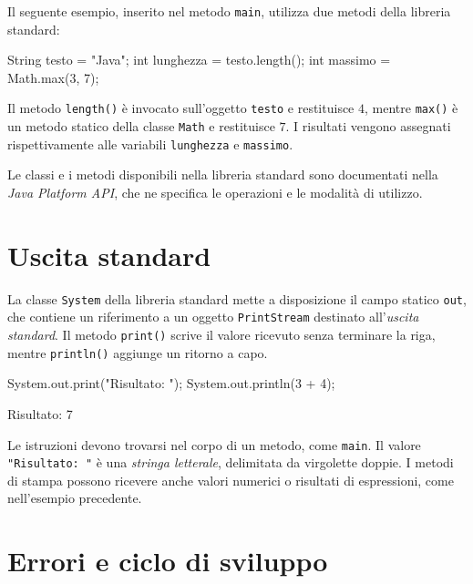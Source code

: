 \begin{example}
Il seguente esempio, inserito nel metodo \texttt{main},
utilizza due metodi della libreria standard:
\begin{unipdcode}[language=Java]
String testo = "Java";
int lunghezza = testo.length();
int massimo = Math.max(3, 7);
\end{unipdcode}
Il metodo \texttt{length()} è invocato sull'oggetto
\texttt{testo} e restituisce \(4\), mentre
\texttt{max()} è un metodo statico della classe
\texttt{Math} e restituisce \(7\). I risultati vengono
assegnati rispettivamente alle variabili \texttt{lunghezza}
e \texttt{massimo}.
\end{example}

Le classi e i metodi disponibili nella libreria standard sono
documentati nella \emph{Java Platform API}, che ne specifica
le operazioni e le modalità di utilizzo.

\section{Uscita standard}
\label{sec:fi-java-uscita-standard}

La classe \texttt{System} della libreria standard mette a
disposizione il campo statico \texttt{out}, che contiene un
riferimento a un oggetto \texttt{PrintStream} destinato
all'\emph{uscita standard}. Il metodo \texttt{print()}
scrive il valore ricevuto senza terminare la riga, mentre
\texttt{println()} aggiunge un ritorno a capo.

\begin{unipdcode}[language=Java]
System.out.print("Risultato: ");
System.out.println(3 + 4);
\end{unipdcode}

\begin{unipdterminal}
Risultato: 7
\end{unipdterminal}

Le istruzioni devono trovarsi nel corpo di un metodo, come
\texttt{main}. Il valore \texttt{"Risultato: "} è una
\emph{stringa letterale}, delimitata da virgolette doppie.
I metodi di stampa possono ricevere anche valori numerici
o risultati di espressioni, come nell'esempio precedente.

\clearpage

\section{Errori e ciclo di sviluppo}
\label{sec:fi-java-errori}

